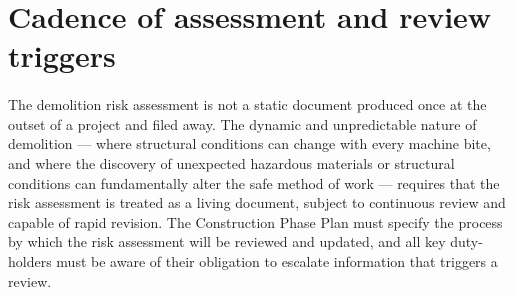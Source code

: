 \section{Cadence of assessment and review triggers}

\paragraph{}
The demolition risk assessment is not a static document produced once at the outset of a project and filed away. The dynamic and unpredictable nature of demolition — where structural conditions can change with every machine bite, and where the discovery of unexpected hazardous materials or structural conditions can fundamentally alter the safe method of work — requires that the risk assessment is treated as a living document, subject to continuous review and capable of rapid revision. The Construction Phase Plan must specify the process by which the risk assessment will be reviewed and updated, and all key duty-holders must be aware of their obligation to escalate information that triggers a review.

